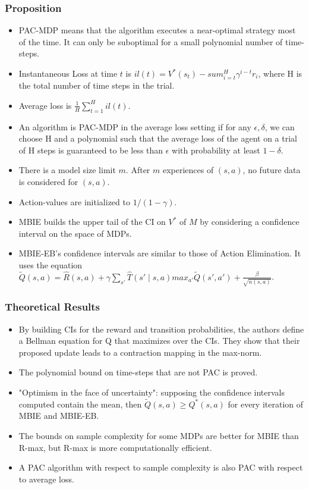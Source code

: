 \documentclass[12pt, oneside]{amsart}
\begin{document}
	\subsubsection*{Proposition}
	\begin{itemize}
		\item PAC-MDP means that the algorithm executes a near-optimal strategy most of the time. It can only be suboptimal for a small polynomial number of time-steps.
		\item Instantaneous Loss at time $t$ is $il(t) = V^*(s_t) - sum_{i=t}^H\gamma^{i-t}r_i$, where H is the total number of time steps in the trial.
		\item Average loss is $\frac{1}{H} \sum_{t=1}^{H} il(t)$.
		\item An algorithm is PAC-MDP in the average loss setting if for any $\epsilon, \delta$, we can choose H and a polynomial such that the average loss of the agent on a trial of H steps is guaranteed to be less than $\epsilon$ with probability at least $1-\delta$. 
		\item There is a model size limit $m$. After $m$ experiences of $(s, a)$, no future data is considered for $(s,a)$. 
		\item Action-values are initialized to $1/(1-\gamma)$.
		\item MBIE builds the upper tail of the CI on $V^*$ of $M$ by considering a confidence interval on the space of MDPs.
		\item MBIE-EB's confidence intervals are similar to those of Action Elimination. It uses the equation $\tilde{Q}(s,a) = \hat{R}(s,a) + \gamma \sum_{s'}\hat{T}(s'\mid s,a) max_{a'}\tilde{Q}(s',a') + \frac{\beta}{\sqrt{n(s,a)}}$.
	\end{itemize}
	
	\subsubsection*{Theoretical Results}
	\begin{itemize}
		\item By building CIs for the reward and transition probabilities, the authors define a Bellman equation for Q that maximizes over the CIs. They show that their proposed update leads to a contraction mapping in the max-norm. 
		\item The polynomial bound on time-steps that are not PAC is proved.
		\item "Optimism in the face of uncertainty": supposing the confidence intervals computed contain the mean, then $\tilde{Q}(s,a)\geq Q^*(s,a)$ for every iteration of MBIE and MBIE-EB.
		\item The bounds on sample complexity for some MDPs are better for MBIE than R-max, but R-max is more computationally efficient.
		\item A PAC algorithm with respect to sample complexity is also PAC with respect to average loss.
	\end{itemize}
	
\end{document}
